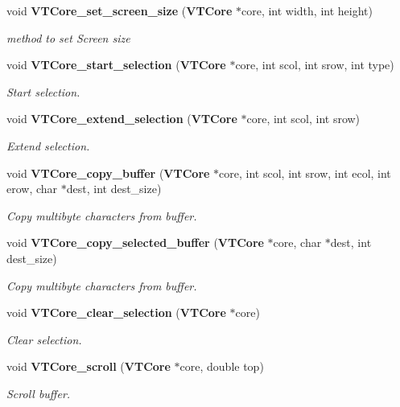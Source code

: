 \begin{CompactItemize}
void {\bf VTCore\_\-set\_\-screen\_\-size} ({\bf VTCore} $\ast$core, int width, int height)
\begin{CompactList}\small\item\em method to set Screen size\item\end{CompactList}\item 
void {\bf VTCore\_\-start\_\-selection} ({\bf VTCore} $\ast$core, int scol, int srow, int type)
\begin{CompactList}\small\item\em Start selection.\item\end{CompactList}\item 
void {\bf VTCore\_\-extend\_\-selection} ({\bf VTCore} $\ast$core, int scol, int srow)
\begin{CompactList}\small\item\em Extend selection.\item\end{CompactList}\item 
void {\bf VTCore\_\-copy\_\-buffer} ({\bf VTCore} $\ast$core, int scol, int srow, int ecol, int erow, char $\ast$dest, int dest\_\-size)
\begin{CompactList}\small\item\em Copy multibyte characters from buffer.\item\end{CompactList}\item 
void {\bf VTCore\_\-copy\_\-selected\_\-buffer} ({\bf VTCore} $\ast$core, char $\ast$dest, int dest\_\-size)
\begin{CompactList}\small\item\em Copy multibyte characters from buffer.\item\end{CompactList}\item 
void {\bf VTCore\_\-clear\_\-selection} ({\bf VTCore} $\ast$core)
\begin{CompactList}\small\item\em Clear selection.\item\end{CompactList}\item 
void {\bf VTCore\_\-scroll} ({\bf VTCore} $\ast$core, double top)
\begin{CompactList}\small\item\em Scroll buffer.\item\end{CompactList}\item 

\end{CompactItemize}
